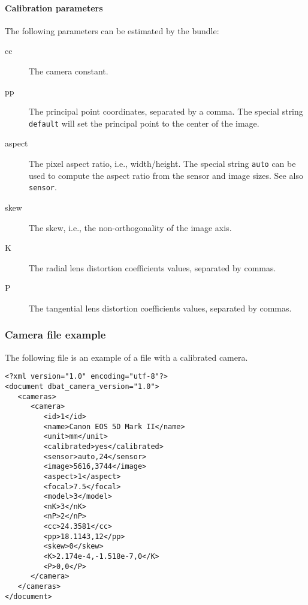 \documentclass{article}
\begin{document}
\paragraph{Calibration parameters}
\label{sec:org60dfc35}
The following parameters can be estimated by the bundle:
\begin{description}
\item[{cc}] The camera constant.
\item[{pp}] The principal point coordinates, separated by a comma. The
special string \texttt{default} will set the principal point to the
center of the image.
\item[{aspect}] The pixel aspect ratio, i.e., width/height. The special
string \texttt{auto} can be used to compute the aspect ratio from
the sensor and image sizes. See also \texttt{sensor}.
\item[{skew}] The skew, i.e., the non-orthogonality of the image axis.
\item[{K}] The radial lens distortion coefficients values, separated by
commas.
\item[{P}] The tangential lens distortion coefficients values, separated
by commas.
\end{description}
\subsubsection{Camera file example}
\label{sec:camFileExample}
The following file is an example of a file with a calibrated camera.
\begin{verbatim}
<?xml version="1.0" encoding="utf-8"?>
<document dbat_camera_version="1.0">
   <cameras>
      <camera>
         <id>1</id>
         <name>Canon EOS 5D Mark II</name>
         <unit>mm</unit>
         <calibrated>yes</calibrated>
         <sensor>auto,24</sensor>
         <image>5616,3744</image>
         <aspect>1</aspect>
         <focal>7.5</focal>
         <model>3</model>
         <nK>3</nK>
         <nP>2</nP>
         <cc>24.3581</cc>
         <pp>18.1143,12</pp>
         <skew>0</skew>
         <K>2.174e-4,-1.518e-7,0</K>
         <P>0,0</P>
      </camera>
   </cameras>
</document>
\end{verbatim}
\end{document}
